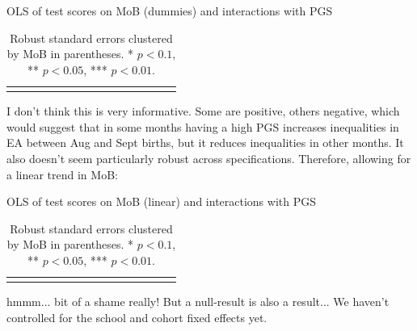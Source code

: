 \documentclass[a4paper,12pt]{article}
\begin{document}
\begin{table}[H]
\caption{OLS of test scores on MoB (dummies) and interactions with PGS}
\centering
{\tiny
\begin{tabular}{lcccccccccccccc}
\toprule

\bottomrule
\addlinespace[.75ex]
\end{tabular}
\caption*{\scriptsize{Robust standard errors clustered by MoB in parentheses. * $p < 0.1$, ** $p < 0.05$, *** $p < 0.01$.}}
}
\end{table}

I don't think this is very informative. Some are positive, others negative, which would suggest that in some months having a high PGS increases inequalities in EA between Aug and Sept births, but it reduces inequalities in other months. It also doesn't seem particularly robust across specifications. Therefore, allowing for a linear trend in MoB:

\bigskip \bigskip

\begin{table}[H]
\caption{OLS of test scores on MoB (linear) and interactions with PGS}
\centering
{\footnotesize
\begin{tabular}{lcccccccccccccc}
\toprule

\bottomrule
\addlinespace[.75ex]
\end{tabular}
\caption*{\scriptsize{Robust standard errors clustered by MoB in parentheses. * $p < 0.1$, ** $p < 0.05$, *** $p < 0.01$.}}
}
\end{table}


hmmm... bit of a shame really! But a null-result is also a result... We haven't controlled for the school and cohort fixed effects yet.
\end{document}
